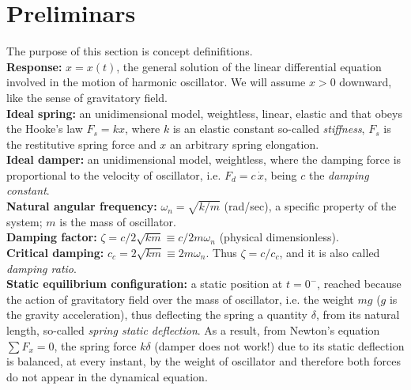 \documentclass[12pt]{article}
\begin{document}
\section{Preliminars}
The purpose of this section is concept definifitions.\\
\textbf{Response:} $x=x(t)$, the general solution of the linear differential equation involved in the motion of harmonic oscillator. We will assume $x>0$ downward, like the sense of gravitatory field.\\
\textbf{Ideal spring:} an unidimensional model, weightless, linear, elastic and that obeys the Hooke's law $F_s=kx$, where $k$ is an elastic constant so-called \emph{stiffness}, $F_s$ is the restitutive spring force and $x$ an arbitrary spring elongation. \\
\textbf{Ideal damper:} an unidimensional model, weightless, where the damping force is proportional to the velocity of oscillator, i.e. $F_d=c\,\dot{x}$, being $c$ the \emph{damping constant}. \\
\textbf{Natural angular frequency:} $\omega_n=\sqrt{k/m}$ (rad/sec), a specific property of the system; $m$ is the mass of oscillator. \\
\textbf{Damping factor:} $\zeta=c/2\sqrt{km}\equiv c/2m\omega_n$ (physical dimensionless). \\ 
\textbf{Critical damping:} $c_c=2\sqrt{km}\equiv 2m\omega_n$. Thus $\zeta=c/c_c$, and it is also called \emph{damping ratio}. \\
\textbf{Static equilibrium configuration:} a static position at $t=0^-$, reached because the action of gravitatory field over the mass of oscillator, i.e. the weight $mg$ ($g$ is the gravity acceleration), thus deflecting the spring a quantity $\delta$, from its natural length, so-called \emph{spring static deflection}. As a result, from Newton's equation $\sum F_x=0$, the spring force $k\delta$ (damper does not work!) due to its static deflection is balanced, at every instant, by the weight of oscillator and therefore both forces do not appear in the dynamical equation. 
\end{document}
